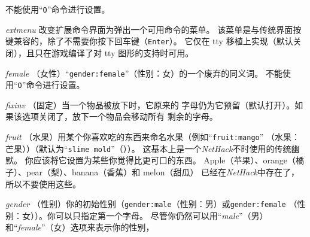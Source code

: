 \documentclass[a4paper, 10pt]{article}
\newcommand{\ib}[1]{\it #1 \hfill}
\begin{document}
不能使用“{\tt O}”命令进行设置。
\item[\ib{extmenu}]
改变扩展命令界面为弹出一个可用命令的菜单。
该菜单是与传统界面按键兼容的，除了不需要你按下回车键（{\tt Enter}）。
它仅在 tty 移植上实现（默认关闭），且只在游戏编译了对 tty 图形的支持时可用。
\item[\ib{female}]
（女性）“{\tt gender:female}”（性别：女）的一个废弃的同义词。
不能使用“{\tt O}”命令进行设置。
\item[\ib{fixinv}]
（固定\zhTransInventory）当一个物品被放下时，它原来的\zhTransInventory
字母仍为它预留（默认打开）。如果该选项关闭了，放下一个物品会移动所有
剩余的\zhTransInventory{}字母。
\item[\ib{fruit}]
（水果）用某个你喜欢吃的东西来命名水果（例如“{\tt fruit:mango}”
（水果：芒果））（默认为“{\tt slime mold}”（\zhTransSlimeMold））。
这基本上是一个{\it NetHack}不时使用的传统幽默。
你应该将它设置为某些你觉得比\zhTransSlimeMold{}更可口的东西。
Apple（苹果）、orange（橘子）、pear（梨）、banana（香蕉）和 melon（甜瓜）
已经在{\it NetHack}中存在了，所以不要使用这些。
\item[\ib{gender}]
（性别）你的初始性别（{\tt gender:male}（性别：男）或{\tt gender:female}
（性别：女））。你可以只指定第一个字母。
尽管你仍然可以用“{\it male}”（男）和“{\it female}”（女）选项来表示你的性别，
\end{document}
